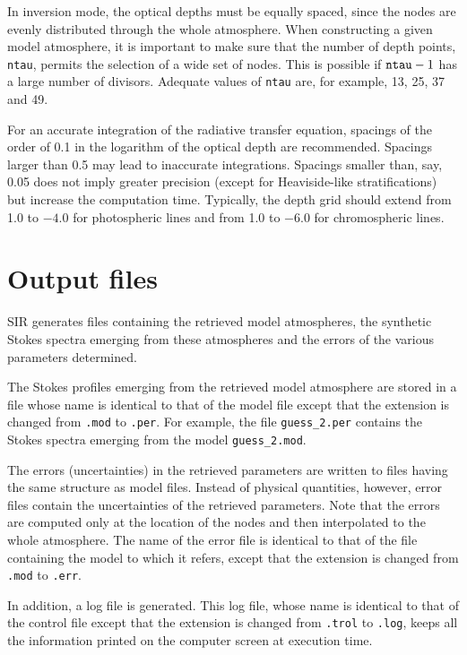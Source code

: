 In inversion mode, the optical depths must be equally spaced, since the
nodes are evenly distributed through the whole atmosphere. When
constructing a given model atmosphere, it is important to make sure
that the number of depth points, {\tt ntau}, permits the selection of a
wide set of nodes. This is possible if ${\tt ntau} -1$ has a large
number of divisors. Adequate values of {\tt ntau} are, for example, 13,
25, 37 and 49.

For an accurate integration of the radiative transfer equation,
spacings of the order of 0.1 in the logarithm of the optical depth are
recommended. Spacings larger than 0.5 may lead to inaccurate
integrations. Spacings smaller than, say, 0.05 does not imply greater
precision (except for Heaviside-like stratifications) but increase the
computation time.  Typically, the depth grid should extend from 1.0 to
$-4.0$ for photospheric lines and from 1.0 to $-6.0$ for chromospheric
lines.


\section{Output files}
SIR generates files containing the retrieved model atmospheres, the
synthetic Stokes spectra emerging from these atmospheres and the
errors of the various parameters determined. 

The Stokes profiles emerging from the retrieved model atmosphere
are stored in a file whose name is identical to that of the model 
file except that the extension is changed from
{\tt .mod} to {\tt .per}. For example, the file {\tt guess\_2.per}
contains the Stokes spectra emerging from the model {\tt guess\_2.mod}.

The errors (uncertainties) in the retrieved parameters are
written to files having the same structure as model files. 
Instead of physical quantities, however, error files contain the 
uncertainties of the retrieved parameters. Note that the 
errors are computed only at the location of the nodes and
then interpolated to the whole atmosphere. The name of
the error file is identical to that of the file containing
the model to which it refers, except that the extension is
changed from {\tt .mod} to {\tt .err}. 

In addition, a log file is generated. This log file, whose
name is identical to that of the control file except that the
extension is changed from {\tt .trol} to {\tt .log}, keeps
all the information printed on the computer screen at execution
time. 

